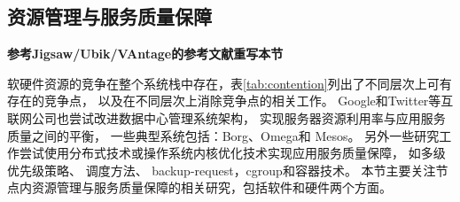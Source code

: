 

\subsection{资源管理与服务质量保障}

\textbf{参考Jigsaw/Ubik/VAntage的参考文献重写本节}

软硬件资源的竞争在整个系统栈中存在，表\ref{tab:contention}列出了不同层次上可有存在的竞争点，
以及在不同层次上消除竞争点的相关工作。
Google和Twitter等互联网公司也尝试改进数据中心管理系统架构，
实现服务器资源利用率与应用服务质量之间的平衡，
一些典型系统包括：Borg\cite{borg:2015}、Omega\cite{Schwarzkopf_omega_2013}和
Mesos\cite{Hindman:2011:Mesos}。
另外一些研究工作尝试使用分布式技术或操作系统内核优化技术实现应用服务质量保障，
如多级优先级策略\cite{google_trace}、
调度方法\cite{delimitrou_paragon:_2013, delimitrou_quasar:_2014,  mars_heterogeneity_2011,
kozyrakis_reconciling_2014, Novakovi:ATC2013}、
backup-request\cite{dean_tail_2013}，cgroup\cite{cgroup}和容器技术\cite{lxc}。 
本节主要关注节点内资源管理与服务质量保障的相关研究，包括软件和硬件两个方面。

